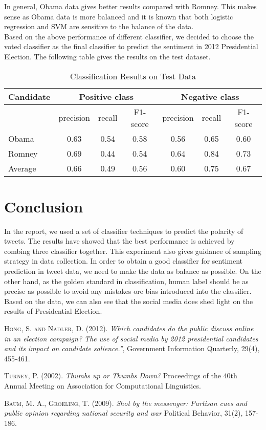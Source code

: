 \documentclass[paper=a4, fontsize=12pt]{scrartcl}
\numberwithin{equation}{section}
\numberwithin{figure}{section}
\numberwithin{table}{section}
\begin{document}
In general, Obama data gives better results compared with Romney. This makes sense as Obama data is more balanced and it is known that both logistic regression and SVM are sensitive to the balance of the data. \\[5pt]
Based on the above performance of different classifier, we decided to choose the voted classifier as the final classifier to predict the sentiment in 2012 Presidential Election. The following table gives the results on the test dataset. 
\begin{table}[H]
\begin{tabular}{|p{4cm}|c c c| c c c|}
\hline Candidate&\multicolumn{3}{|c|}{Positive class} & \multicolumn{3}{c|}{Negative class}\\
\hline
& precision & recall & F1-score  & precision & recall & F1-score\\
\hline
Obama & 0.63 &0.54 & 0.58  &0.56  & 0.65 & 0.60\\
\hline
Romney & 0.69  &0.44  &0.54  & 0.64  & 0.84 & 0.73\\
\hline
Average & 0.66 & 0.49 & 0.56 & 0.60 & 0.75 & 0.67\\
\hline
\end{tabular}
\caption{Classification Results on Test Data}\label{table:table 3}
\end{table}

\section{Conclusion}
In the report, we used a set of classifier techniques to predict the polarity of tweets. The results have showed that the best performance is achieved by combing three classifier together. This experiment also gives guidance of sampling strategy in data collection. In order to obtain a good classifier for sentiment prediction in tweet data, we need to make the data as balance as possible. On the other hand, as the golden standard in classification, human label should be as precise as possible to avoid any mistakes ore bias introduced into the classifier. Based on the data, we can also see that the social media does shed light on the results of Presidential Election.


\begin{thebibliography}{9}

\textsc{Hong, S. and Nadler, D.} (2012). \textit{Which candidates do the public discuss online in an election campaign? The use of social media by 2012 presidential candidates and its impact on candidate salience.”}, Government Information Quarterly, 29(4), 455-461.


\textsc{Turney, P.}  (2002). \textit{Thumbs up or Thumbs Down?}  Proceedings of the 40th Annual Meeting on Association for Computational Linguistics.

\textsc{Baum, M. A., Groeling, T.}  (2009). \textit{Shot by the messenger: Partisan cues and public opinion regarding national security and war}  Political Behavior, 31(2), 157-186.

\end{thebibliography}
\end{document}
